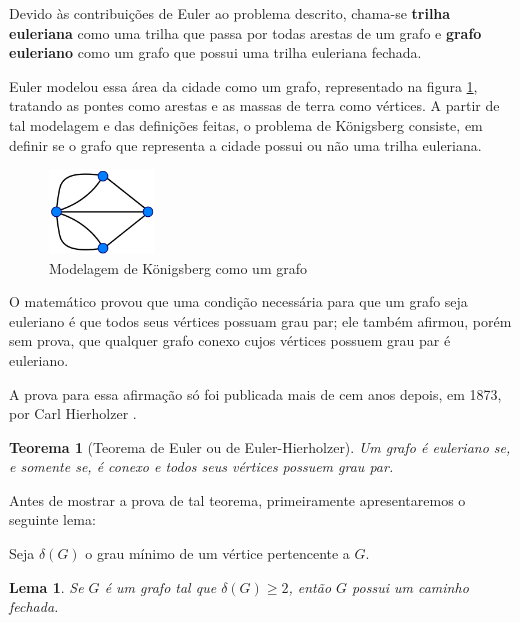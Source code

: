 \documentclass{article}
\newtheorem{theorem}{Teorema}[section]
\newtheorem{lemma}{Lema}
\begin{document}
Devido às contribuições de Euler ao problema descrito, chama-se \textbf{trilha euleriana} como uma trilha que passa por todas arestas de um grafo e \textbf{grafo euleriano} como um grafo que possui uma trilha euleriana fechada.

Euler modelou essa área da cidade como um grafo, representado na figura \ref{konigsberg-graph}, tratando as pontes como arestas e as massas de terra como vértices.
A partir de tal modelagem e das definições feitas, o problema de Königsberg consiste, em definir se o grafo que representa a cidade possui ou não uma trilha euleriana. 


\begin{figure}
    \centering
    \includegraphics[width=0.25\textwidth]{konigsberg-graph.png}
    \caption{Modelagem de Königsberg como um grafo}
    \label{konigsberg-graph}
\end{figure}

O matemático provou que uma condição necessária para que um grafo seja euleriano é que todos seus vértices possuam grau par; 
ele também afirmou, porém sem prova, que qualquer grafo conexo cujos vértices possuem grau par é euleriano.

A prova para essa afirmação só foi publicada mais de cem anos depois, em 1873, por Carl Hierholzer \cite{hierholzer}.

\begin{theorem}[Teorema de Euler ou de Euler-Hierholzer]
    \label{euler}
    Um grafo é euleriano se, e somente se, é conexo e todos seus vértices possuem grau par.
\end{theorem}

Antes de mostrar a prova de tal teorema, primeiramente apresentaremos o seguinte lema:

Seja $\delta(G)$ o grau mínimo de um vértice pertencente a $G$.

\begin{lemma}
	\label{lema}
	Se $G$ é um grafo tal que $\delta(G) \geq 2$, então $G$ possui um caminho fechada.
\end{lemma}
\end{document}
